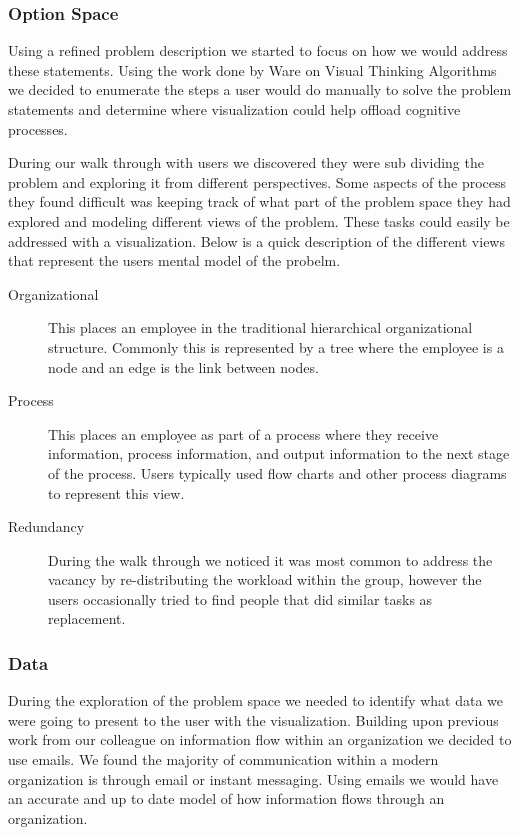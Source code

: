 \message{ !name(FinalPaper.tex)}\documentclass[journal]{vgtc}                %
\begin{document}
\subsubsection{Option Space}
Using a refined problem description we started to focus on how we would address these statements.  Using the work done by Ware on Visual Thinking Algorithms\cite[Chapter 11]{ware2012information} we decided to enumerate the steps a user would do manually to solve the problem statements and determine where visualization could help offload cognitive processes.

During our walk through with users we discovered they were sub dividing the problem and exploring it from different perspectives.  Some aspects of the process they found difficult was keeping track of what part of the problem space they had explored and modeling different views of the problem.  These tasks could easily be addressed with a visualization.  Below is a quick description of the different views that represent the users mental model of the probelm.
\begin{description}
\item [Organizational] This places an employee in the traditional hierarchical organizational structure.  Commonly this is represented by a tree where the employee is a node and an edge is the link between nodes.
\item [Process] This places an employee as part of a process where they receive information, process information, and output information to the next stage of the process.  Users typically used flow charts and other process diagrams to represent this view.
\item [Redundancy] During the walk through we noticed it was most common to address the vacancy by re-distributing the workload within the group, however the users occasionally tried to find people that did similar tasks as replacement.
\end{description}

\subsubsection{Data}
During the exploration of the problem space we needed to identify what data we were going to present to the user with the visualization.  Building upon previous work from our colleague on information flow within an organization we decided to use emails.  We found the majority of communication within a modern organization is through email or instant messaging.  Using emails we would have an accurate and up to date model of how information flows through an organization.  
\end{document}
